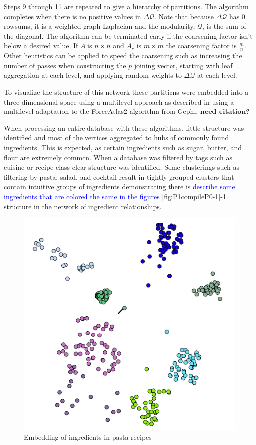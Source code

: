 \documentclass[conference]{IEEEtran}
\newcommand{\panayot}[1]{\textcolor{blue}{#1}}
\begin{document}
Steps 9 through 11 are
repeated to give a hierarchy of partitions. The algorithm completes when there is no
positive values in $\Delta \mathcal{Q}$. Note that because $\Delta \mathcal{Q}$ has 0 rowsums, 
it is a weighted graph Laplacian and the modularity, $\mathcal{Q}$, is the sum of the diagonal.
The algorithm can be terminated early if the coarsening factor isn't below a desired value.
If $A$ is $n \times n$ and $A_c$ is $m \times m$ the coarsening factor is $\frac{m}{n}$.
Other heuristics can be applied to speed the coarsening such as increasing the number of passes
when constructing the $p$ joining vector, starting with leaf aggregation at each level, and
applying random weights to $\Delta \mathcal{Q}$ at each level.

To visualize the structure of this network these partitions were embedded into a three 
dimensional space using a multilevel approach as described in \cite{Quiring19embed} using
a multilevel adaptation to the ForceAtlas2 algorithm from Gephi. \textbf{need citation?}

When processing an entire
database with these algorithms, little structure was identified and most of the vertices
aggregated to hubs of commonly found ingredients. This is expected, as certain ingredients such as sugar, butter, and
flour are extremely common. When a database was filtered by tags such as cuisine or recipe class clear structure
was identified. Some clusterings such as filtering by pasta, salad, and cocktail result in
tightly grouped clusters that contain intuitive groups of ingredients demonstrating there is
{\panayot{describe some ingredients that are colored the same in  the figures}} \ref{fig:P1compileP0-1}-\ref{fig:P2compileP0-1}. 
structure in the network of ingredient relationships.

  \begin{figure}[h!]
	\centering
	\includegraphics[width=0.8\linewidth]{pastas.png}
	\caption[Embedding of ingredients in pasta recipes]{Embedding of ingredients in pasta recipes}
	\label{fig:P2compileP0-1}
  \end{figure}
\end{document}
